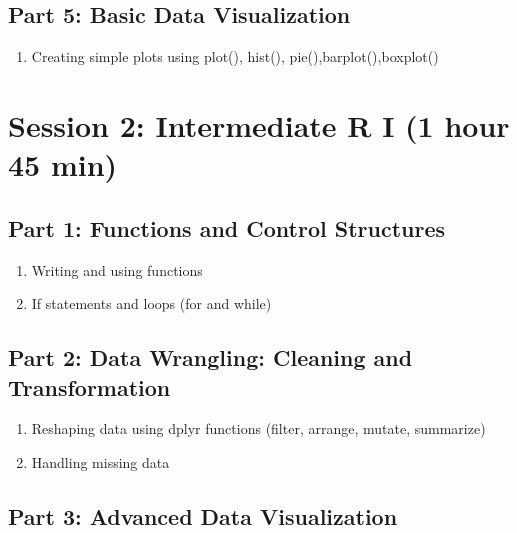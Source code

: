 \documentclass[
]{book}
\providecommand{\tightlist}{%
  \setlength{\itemsep}{0pt}\setlength{\parskip}{0pt}}
\begin{document}
\subsection*{Part 5: Basic Data Visualization}\label{part-5-basic-data-visualization}

\begin{enumerate}
\def\labelenumi{\arabic{enumi}.}
\tightlist
\item
  Creating simple plots using plot(), hist(), pie(),barplot(),boxplot()
\end{enumerate}

\section*{Session 2: Intermediate R I (1 hour 45 min)}\label{session-2-intermediate-r-i-1-hour-45-min}

\subsection*{Part 1: Functions and Control Structures}\label{part-1-functions-and-control-structures}

\begin{enumerate}
\def\labelenumi{\arabic{enumi}.}
\tightlist
\item
  Writing and using functions
\item
  If statements and loops (for and while)
\end{enumerate}

\subsection*{Part 2: Data Wrangling: Cleaning and Transformation}\label{part-2-data-wrangling-cleaning-and-transformation}

\begin{enumerate}
\def\labelenumi{\arabic{enumi}.}
\tightlist
\item
  Reshaping data using dplyr functions (filter, arrange, mutate, summarize)
\item
  Handling missing data
\end{enumerate}

\subsection*{Part 3: Advanced Data Visualization}\label{part-3-advanced-data-visualization}
\end{document}
